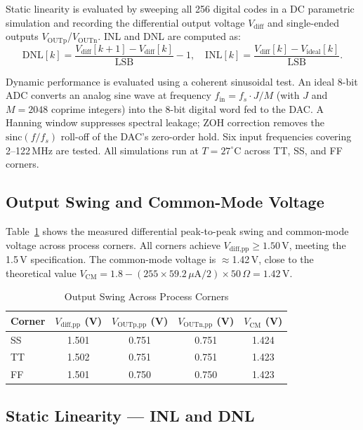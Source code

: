 \documentclass[lettersize,journal]{IEEEtran}
\begin{document}
Static linearity is evaluated by sweeping all 256 digital codes in a DC
parametric simulation and recording the differential output voltage $V_\text{diff}$
and single-ended outputs $V_\text{OUTp}$/$V_\text{OUTn}$.
INL and DNL are computed as:
\begin{equation}
  \text{DNL}[k] = \frac{V_\text{diff}[k+1]-V_\text{diff}[k]}{\text{LSB}} - 1,
  \quad
  \text{INL}[k] = \frac{V_\text{diff}[k]-V_\text{ideal}[k]}{\text{LSB}}.
\end{equation}

Dynamic performance is evaluated using a coherent sinusoidal test.
An ideal 8-bit ADC converts an analog sine wave at frequency
$f_\text{in} = f_s \cdot J/M$ (with $J$ and $M = 2048$ coprime integers)
into the 8-bit digital word fed to the DAC.
A Hanning window suppresses spectral leakage; ZOH correction removes the
$\text{sinc}(f/f_s)$ roll-off of the DAC's zero-order hold.
Six input frequencies covering 2--122\,MHz are tested.
All simulations run at $T = 27^\circ$C across TT, SS, and FF corners.

\subsection{Output Swing and Common-Mode Voltage}

Table~\ref{tab:swing} shows the measured differential peak-to-peak swing and
common-mode voltage across process corners.
All corners achieve $V_\text{diff,pp} \geq 1.50$\,V, meeting the 1.5\,V specification.
The common-mode voltage is $\approx$1.42\,V, close to the theoretical value
$V_\text{CM} = 1.8 - (255 \times 59.2\,\mu\text{A}/2)\times50\,\Omega = 1.42\,\text{V}$.

\begin{table}[h]
  \renewcommand{\arraystretch}{1.2}
  \caption{Output Swing Across Process Corners}
  \label{tab:swing}
  \centering
  \begin{tabular}{lcccc}
    \toprule
    \textbf{Corner} & $V_\text{diff,pp}$ (V) & $V_\text{OUTp,pp}$ (V) & $V_\text{OUTn,pp}$ (V) & $V_\text{CM}$ (V) \\
    \midrule
    SS & 1.501 & 0.751 & 0.751 & 1.424 \\
    TT & 1.502 & 0.751 & 0.751 & 1.423 \\
    FF & 1.501 & 0.750 & 0.750 & 1.423 \\
    \bottomrule
  \end{tabular}
\end{table}

\subsection{Static Linearity — INL and DNL}
\end{document}
